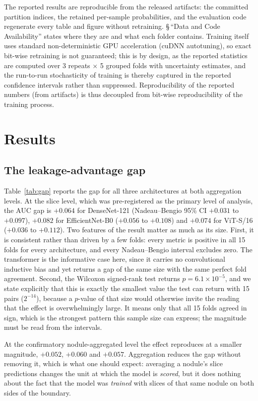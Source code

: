 \documentclass{ieeeaccess}
\begin{document}
The reported results are reproducible from the released artifacts: the committed partition indices,
the retained per-sample probabilities, and the evaluation code regenerate every table and figure
without retraining. \S\,``Data and Code Availability'' states where they are and what each folder
contains. Training itself uses standard non-deterministic GPU acceleration (cuDNN
autotuning), so exact bit-wise retraining is not guaranteed; this is by design, as the reported
statistics are computed over 3 repeats $\times$ 5 grouped folds with
uncertainty estimates, and the run-to-run stochasticity of training is thereby captured in the
reported confidence intervals rather than suppressed. Reproducibility of the reported numbers
(from artifacts) is thus decoupled from bit-wise reproducibility of the training process.

\section{Results}
\subsection{The leakage-advantage gap}
Table~\ref{tab:gap} reports the gap for all three architectures at both aggregation levels. At the
slice level, which was pre-registered as the primary level of analysis, the AUC gap is $+0.064$ for
DenseNet-121 (Nadeau--Bengio 95\% CI $+0.031$ to $+0.097$), $+0.082$ for EfficientNet-B0
($+0.056$ to $+0.108$) and $+0.074$ for ViT-S/16 ($+0.036$ to $+0.112$). Two features of the result
matter as much as its size. First, it is consistent rather than driven by a few folds: every metric
is positive in all 15 folds for every architecture, and every Nadeau--Bengio interval excludes zero.
The transformer is the informative case here, since it carries no convolutional inductive bias and
yet returns a gap of the same size with the same perfect fold agreement.
Second, the Wilcoxon signed-rank test
returns $p = 6.1\times10^{-5}$, and we state explicitly that this is exactly the smallest value the
test can return with 15 pairs ($2^{-14}$), because a $p$-value of that size would otherwise invite
the reading that the effect is overwhelmingly large. It means only that all 15 folds agreed in sign, which is the strongest pattern
this sample size can express; the magnitude must be read from the intervals.

At the confirmatory nodule-aggregated level the effect reproduces at a smaller magnitude, $+0.052$,
$+0.060$ and $+0.057$. Aggregation reduces the gap without removing it, which is what one should expect:
averaging a nodule's slice predictions changes the unit at which the model is \emph{scored}, but it
does nothing about the fact that the model was \emph{trained} with slices of that same nodule on
both sides of the boundary.
\end{document}
